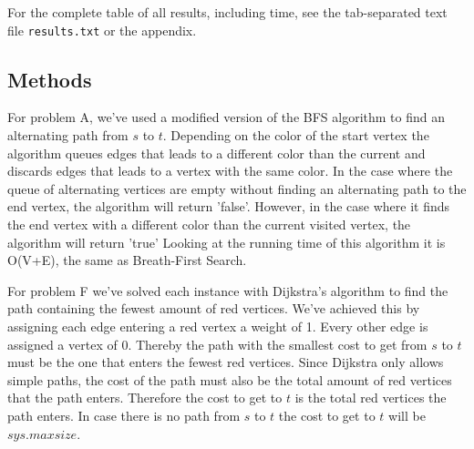 \documentclass{tufte-handout}
\begin{document}
For the complete table of all results, including time, see the tab-separated text file {\tt results.txt} or the appendix.

\subsection{Methods}

For problem A, we've used a modified version of the BFS algorithm to find an alternating path from $s$ to $t$. Depending on the color of the start vertex the algorithm queues edges that leads to a different color than the current and discards edges that leads to a vertex with the same color. In the case where the queue of alternating vertices are empty without finding an alternating path to the end vertex, the algorithm will return 'false'. However, in the case where it finds the end vertex with a different color than the current visited vertex, the algorithm will return 'true'
Looking at the running time of this algorithm it is O(V+E), the same as Breath-First Search.

For problem F we've solved each instance with Dijkstra's algorithm to find the path containing the fewest amount of red vertices. We've achieved this by assigning each edge entering a red vertex a weight of 1. Every other edge is assigned a vertex of 0. Thereby the path with the smallest cost to get from $s$ to $t$ must be the one that enters the fewest red vertices. Since Dijkstra only allows simple paths, the cost of the path must also be the total amount of red vertices that the path enters. Therefore the cost to get to $t$ is the total red vertices the path enters. In case there is no path from $s$ to $t$ the cost to get to $t$ will be $sys.maxsize$.
\end{document}
